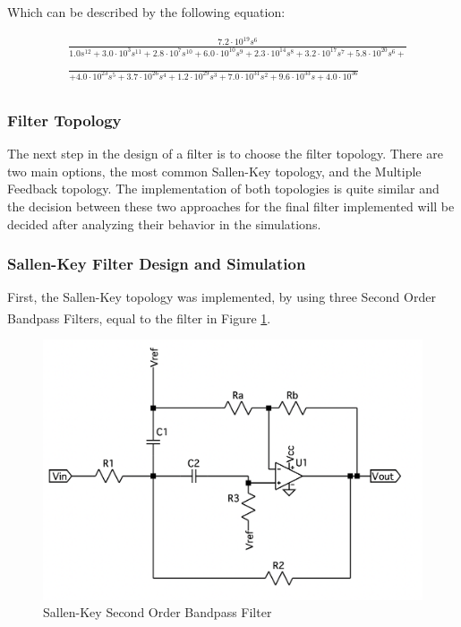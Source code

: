 Which can be described by the following equation:

\begin{equation}
    \begin{aligned}
        & \frac{7.2 \cdot 10^{19} s^{6}}{1.0 s^{12} + 3.0 \cdot 10^{3} s^{11} + 2.8 \cdot 10^{7} s^{10} + 6.0 \cdot 10^{10} s^{9} + 2.3 \cdot 10^{14} s^{8} + 3.2 \cdot 10^{17} s^{7} + 5.8 \cdot 10^{20} s^{6} + } \\
        &\\
        & \frac{}{ + 4.0 \cdot 10^{23} s^{5} + 3.7 \cdot 10^{26} s^{4} + 1.2 \cdot 10^{29} s^{3} + 7.0 \cdot 10^{31} s^{2} + 9.6 \cdot 10^{33} s + 4.0 \cdot 10^{36}} \\
        &      
    \end{aligned}    
    \label{eq:FilterFT}
\end{equation}

\subsubsection{Filter Topology}

The next step in the design of a filter is to choose the filter topology. There are two main options, the most common Sallen-Key topology, and the Multiple Feedback topology. The implementation of both topologies is quite similar and the decision between these two approaches for the final filter implemented will be decided after analyzing their behavior in the simulations.

\subsubsection{Sallen-Key Filter Design and Simulation}

First, the Sallen-Key topology was implemented, by using three Second Order Bandpass Filters, equal to the filter in Figure \ref{fig:SingleSK}\textsuperscript{\cite{Active-Filter-Design-Techniques}}.

\begin{figure}[H]
    \centering
    \includegraphics*[scale = 0.3]{Images/SingleSK.png}
    \caption{Sallen-Key Second Order Bandpass Filter}
    \label{fig:SingleSK}
\end{figure}

